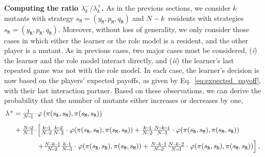 \documentclass[11pt]{article}
\def\resident{\texttt{R}}
\def\mutant{\texttt{M}}
\def\strategy{s}
\theoremstyle{plainCl1}
\theoremstyle{plainCl2}
\begin{document}
\noindent
{\bf Computing the ratio $\lambda^-_k/\lambda^+_k$.}
As in the previous sections, we consider \(k\) mutants with strategy
\(\strategy_\mutant \!=\! (y_\mutant, p_\mutant, q_\mutant)\) and \(N\!-\!k\)~residents
with strategies \(\strategy_\resident = (y_\resident, p_\resident,
q_\resident)\). Moreover, without loss of generality, we only consider 
those cases in which either the learner or the role model is a resident, and the other player is a mutant. 
As in previous cases, two major cases must be considered, ({\it i}) the learner and the role model interact directly, and ({\it ii}) the learner's last repeated game was not with the role model.
In each case, the learner's decision is now based on the players' expected payoffs, as given by Eq.~\eqref{eq:expected_payoff}, with their last interaction partner. 
Based on these observations, we can derive the probability that the number of
mutants either increases or decreases by one,
\begin{equation*}
  \setlength{\arraycolsep}{1pt} 
  \begin{array}{llll}
    \lambda^+	 &=
  &\frac{1}{N\!-\!1}\cdot  & \varphi\left(\pi (\strategy_\resident, \strategy_\mutant), \pi (\strategy_\mutant, \strategy_\resident)\right)\\[0.3cm]
  &+
  &\frac{N\!-\!2}{N\!-\!1} \cdot 
  &\left[ \frac{k\!-\!1}{N\!-\!2}\frac{k\!-\!2}{N\!-\!3}\cdot \varphi(\pi (\strategy_\resident, \strategy_\mutant), \pi (\strategy_\mutant, \strategy_\mutant)) + 
   \frac{k\!-\!1}{N\!-\!2}\frac{N\!-\!k\!-\!1}{N\!-\!3}\cdot \varphi(\pi (\strategy_\resident, \strategy_\mutant), \pi (\strategy_\mutant, \strategy_\resident)) \right.\\[0.3cm]
  &&&\left. +\frac{N\!-\!k\!-\!1}{N\!-\!2}\frac{k\!-\!1}{N\!-\!3} \cdot \varphi(\pi (\strategy_\resident, \strategy_\resident), \pi (\strategy_\mutant, \strategy_\mutant)) + 
   \frac{N\!-\!k\!-\!1}{N\!-\!2}\frac{N\!-\!k\!-\!2}{N\!-\!3} \cdot \varphi(\pi (\strategy_\resident, \strategy_\resident), \pi (\strategy_\mutant, \strategy_\resident))\right],
  \end{array}
\end{equation*}
\end{document}
